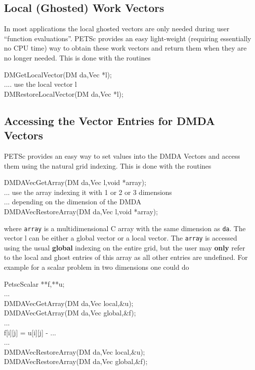 \subsection{Local (Ghosted) Work Vectors}
In most applications the local ghosted vectors are only needed during user
``function evaluations''. PETSc provides an easy light-weight (requiring
essentially no CPU time) way to obtain these work vectors and return them when
they are no longer needed. This is done with the routines
\begin{tabbing}
  DMGetLocalVector(DM da,Vec *l);\\
   .... use the local vector l\\
  DMRestoreLocalVector(DM da,Vec *l);
\end{tabbing}

\subsection{Accessing the Vector Entries for DMDA Vectors}
PETSc provides an easy way to set values into the DMDA Vectors and access them using
the natural grid indexing. This is done with the routines
\begin{tabbing}
  DMDAVecGetArray(DM da,Vec l,void *array);\\
   ... use the array indexing it with 1 or 2 or 3 dimensions \\
   ... depending on the dimension of the DMDA\\
  DMDAVecRestoreArray(DM da,Vec l,void *array);
\end{tabbing}
where {\tt array} is a multidimensional C array with the same dimension as
{\tt da}. The vector l can be either a global vector or a local vector.
The {\tt array} is accessed using the usual {\bf global} indexing
on the entire grid, but the user may {\bf only} refer to the local and ghost
entries of this array as all other entries are undefined. For example for a
scalar problem in two dimensions one could do
\begin{tabbing}
   PetscScalar **f,**u;\\
   ...\\
  DMDAVecGetArray(DM da,Vec local,\&u);\\
  DMDAVecGetArray(DM da,Vec global,\&f);\\
   ...\\
      f[i][j] = u[i][j] - ...\\
   ...\\
  DMDAVecRestoreArray(DM da,Vec local,\&u);\\
  DMDAVecRestoreArray(DM da,Vec global,\&f);
\end{tabbing}

